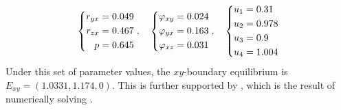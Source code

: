 \begin{equation}\label{params:boundary-xy}
    \begin{dcases}
        \begin{aligned}
            r_{yx} &= 0.049\\
            r_{zx} &= 0.467\\
            p &= 0.645
        \end{aligned}
    \end{dcases},\quad 
    \begin{dcases}
        \begin{aligned}
            \varphi_{xy} &= 0.024\\
            \varphi_{yx} &= 0.163\\
            \varphi_{xz} &= 0.031
        \end{aligned}
    \end{dcases},\quad
    \begin{dcases}
        \begin{aligned}
            u_1 &= 0.31\\
            u_2 &= 0.978\\
            u_3 &= 0.9\\
            u_4 &= 1.004
        \end{aligned}
    \end{dcases}
\end{equation}
Under this set of parameter values, the $xy$-boundary equilibrium is $E_{xy}=(1.0331,1.174,0)$. This is further supported by , which is the result of numerically solving .

